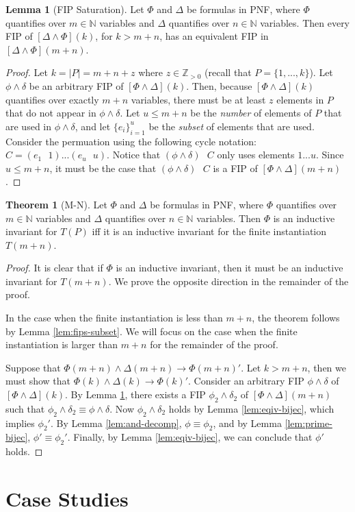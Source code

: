 \documentclass[12pt]{article}
\theoremstyle{definition}
\newtheorem{lemma}{Lemma}
\newtheorem{theorem}{Theorem}
\theoremstyle{remark}
\newcommand{\msp}{\text{ }}
\begin{document}
\begin{lemma}[FIP Saturation]
  \label{lem:fip-sat}
  Let $\Phi$ and $\Delta$ be formulas in PNF, where $\Phi$ quantifies over $m \in \mathbb{N}$ variables and $\Delta$ quantifies over $n \in \mathbb{N}$ variables.  Then every FIP of $[\Delta \land \Phi](k)$, for $k > m+n$, has an equivalent FIP in $[\Delta \land \Phi](m+n)$.
\end{lemma}
\begin{proof}
  Let $k = |P| = m + n + z$ where $z \in \mathbb{Z}_{>0}$ (recall that $P = \{1,...,k\}$).  Let $\phi\land\delta$ be an arbitrary FIP of $[\Phi\land\Delta](k)$.  Then, because $[\Phi\land\Delta](k)$ quantifies over exactly $m+n$ variables, there must be at least $z$ elements in $P$ that do not appear in $\phi\land\delta$.  Let $u \leq m+n$ be the \textit{number} of elements of $P$ that are used in $\phi \land \delta$, and let $\{e_i\}_{i=1}^{u}$ be the \textit{subset} of elements that are used.  Consider the permuation using the following cycle notation: $C = (e_1 \msp 1)...(e_u \msp u)$.  Notice that $(\phi \land \delta) \msp C$ only uses elements $1 ... u$.  Since $u \leq m+n$, it must be the case that $(\phi \land \delta) \msp C$ is a FIP of $[\Phi \land \Delta](m+n)$.
\end{proof}

\begin{theorem}[M-N]
  Let $\Phi$ and $\Delta$ be formulas in PNF, where $\Phi$ quantifies over $m \in \mathbb{N}$ variables and $\Delta$ quantifies over $n \in \mathbb{N}$ variables.  Then $\Phi$ is an inductive invariant for $T(P)$ iff it is an inductive invariant for the finite instantiation $T(m+n)$.
\end{theorem}
\begin{proof}
  It is clear that if $\Phi$ is an inductive invariant, then it must be an inductive invariant for $T(m+n)$.  We prove the opposite direction in the remainder of the proof.

  In the case when the finite instantiation is less than $m+n$, the theorem follows by Lemma \ref{lem:fips-subset}.  We will focus on the case when the finite instantiation is larger than $m+n$ for the remainder of the proof.

  Suppose that $\Phi(m+n) \land \Delta(m+n) \rightarrow \Phi(m+n)'$.  Let $k > m+n$, then we must show that $\Phi(k) \land \Delta(k) \rightarrow \Phi(k)'$.  Consider an arbitrary FIP $\phi\land\delta$ of $[\Phi\land\Delta](k)$.  By Lemma \ref{lem:fip-sat}, there exists a FIP $\phi_2\land\delta_2$ of $[\Phi\land\Delta](m+n)$ such that $\phi_2\land\delta_2 \equiv \phi\land\delta$.  Now $\phi_2\land\delta_2$ holds by Lemma \ref{lem:eqiv-bijec}, which implies $\phi_2'$.  By Lemma \ref{lem:and-decomp}, $\phi \equiv \phi_2$, and by Lemma \ref{lem:prime-bijec}, $\phi' \equiv \phi_2'$.  Finally, by Lemma \ref{lem:eqiv-bijec}, we can conclude that $\phi'$ holds.
\end{proof}


\section{Case Studies}
\end{document}

